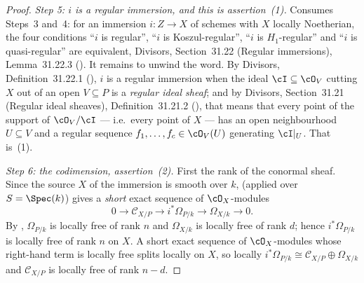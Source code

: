 \begin{proof}
\emph{Step 5: $i$ is a regular immersion, and this is assertion~(1).}
Consumes Steps~3 and~4: for an immersion $i:Z\to X$ of schemes with $X$
locally Noetherian, the four conditions ``$i$ is regular'', ``$i$ is
Koszul-regular'', ``$i$ is $H_1$-regular'' and ``$i$ is quasi-regular''
are equivalent, Divisors, Section~31.22 (Regular immersions),
Lemma~31.22.3 ().  It remains to
unwind the word.  By Divisors, Definition~31.22.1
(), $i$ is a regular
immersion when the ideal $\cI\subseteq\cO_V$ cutting $X$ out of an open
$V\subseteq P$ is a \emph{regular ideal sheaf}; and by Divisors,
Section~31.21 (Regular ideal sheaves), Definition~31.21.2
(), that means that every point of the
support of $\cO_V/\cI$ --- i.e.\ every point of $X$ --- has an open neighbourhood
$U\subseteq V$ and a regular sequence $f_1,\dots,f_c\in\cO_V(U)$
generating $\cI|_U$.  That is~(1).

\emph{Step 6: the codimension, assertion~(2).}  First the rank of the
conormal sheaf.  Since the source $X$ of the immersion is smooth over $k$,
 (applied over $S=\Spec(k)$) gives a
\emph{short} exact sequence of $\cO_X$-modules
\[
0\longrightarrow\mathcal C_{X/P}\longrightarrow i^*\Omega_{P/k}
\longrightarrow\Omega_{X/k}\longrightarrow0 .
\]
By , $\Omega_{P/k}$ is locally free of rank
$n$ and $\Omega_{X/k}$ is locally free of rank $d$; hence
$i^*\Omega_{P/k}$ is locally free of rank $n$ on $X$.  A short exact
sequence of $\cO_X$-modules whose right-hand term is locally free splits
locally on $X$, so locally $i^*\Omega_{P/k}\cong\mathcal C_{X/P}\oplus
\Omega_{X/k}$ and $\mathcal C_{X/P}$ is locally free of rank $n-d$.


\end{proof}
